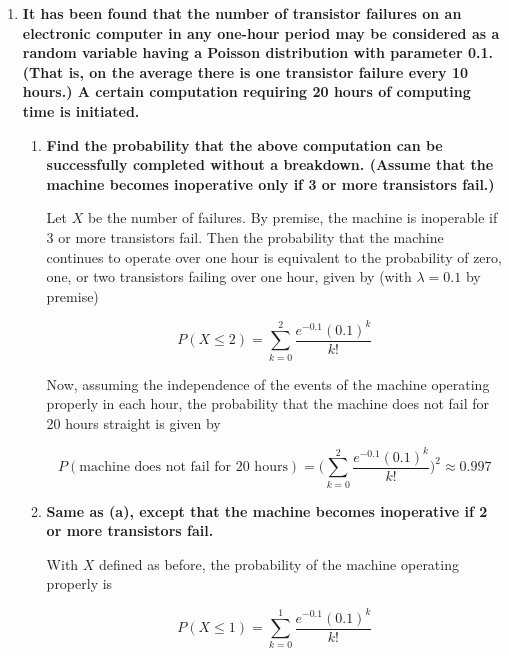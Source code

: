 \documentclass[10pt, oneside]{article}
\begin{document}
\begin{enumerate}[label=8.\arabic*]
\item  \begin{tcolorbox}[
  colback=Cerulean!5!white,
  colframe=Cerulean!75!black]
\textbf{It has been found that the number of transistor failures on an electronic computer in any one-hour period may be considered as a random variable having a Poisson distribution with parameter 0.1. (That is, on the average there is one transistor failure every 10 hours.) A certain computation requiring 20 hours of computing time is initiated.}
\end{tcolorbox}
	
	\begin{enumerate}
	\item  \begin{tcolorbox}[
	  colback=Cerulean!5!white,
	  colframe=Cerulean!75!black]
	\textbf{Find the probability that the above computation can be successfully completed without a breakdown. (Assume that the machine becomes inoperative only if 3 or more transistors fail.)}
	\end{tcolorbox}
	
	Let $X$ be the number of failures. By premise, the machine is inoperable if 3 or more transistors fail. Then the probability that the machine continues to operate over one hour is equivalent to the probability of zero, one, or two transistors failing over one hour, given by (with $\lambda = 0.1$ by premise)
	
	\[ P(X \leq 2) = \sum^2_{k = 0} \frac{e^{-0.1} (0.1)^k}{k!} \]
	
	Now, assuming the independence of the events of the machine operating properly in each hour, the probability that the machine does not fail for 20 hours straight is given by
	
	\[ P(\text{machine does not fail for 20 hours}) = \Bigg( \sum^2_{k=0} \frac{e^{-0.1} (0.1)^k}{k!} \Bigg)^2 \approx \boxed{0.997} \]
	
	\item  \begin{tcolorbox}[
	  colback=Cerulean!5!white,
	  colframe=Cerulean!75!black]
	\textbf{Same as (a), except that the machine becomes inoperative if 2 or more transistors fail.}
	\end{tcolorbox}
	
	With $X$ defined as before, the probability of the machine operating properly is
	
	\[ P(X \leq 1) = \sum^1_{k = 0} \frac{e^{-0.1} (0.1)^k}{k!} \]
	

\end{enumerate}
\end{enumerate}
\end{document}
